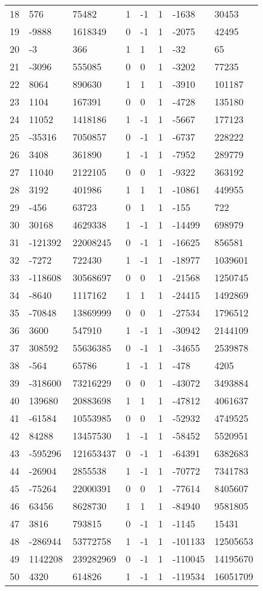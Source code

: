 \documentclass{amsart}
\begin{document}
\begin{longtable}{|l|l|l|lllll|}
18&576&75482&1&-1&1&-1638&30453\\
19&-9888&1618349&0&-1&1&-2075&42495\\
20&-3&366&1&1&1&-32&65\\
21&-3096&555085&0&0&1&-3202&77235\\
22&8064&890630&1&1&1&-3910&101187\\
23&1104&167391&0&0&1&-4728&135180\\
24&11052&1418186&1&-1&1&-5667&177123\\
25&-35316&7050857&0&-1&1&-6737&228222\\
26&3408&361890&1&-1&1&-7952&289779\\
27&11040&2122105&0&0&1&-9322&363192\\
28&3192&401986&1&1&1&-10861&449955\\
29&-456&63723&0&1&1&-155&722\\
30&30168&4629338&1&-1&1&-14499&698979\\
31&-121392&22008245&0&-1&1&-16625&856581\\
32&-7272&722430&1&-1&1&-18977&1039601\\
33&-118608&30568697&0&0&1&-21568&1250745\\
34&-8640&1117162&1&1&1&-24415&1492869\\
35&-70848&13869999&0&0&1&-27534&1796512\\
36&3600&547910&1&-1&1&-30942&2144109\\
37&308592&55636385&0&-1&1&-34655&2539878\\
38&-564&65786&1&-1&1&-478&4205\\
39&-318600&73216229&0&0&1&-43072&3493884\\
40&139680&20883698&1&1&1&-47812&4061637\\
41&-61584&10553985&0&0&1&-52932&4749525\\
42&84288&13457530&1&-1&1&-58452&5520951\\
43&-595296&121653437&0&-1&1&-64391&6382683\\
44&-26904&2855538&1&-1&1&-70772&7341783\\
45&-75264&22000391&0&0&1&-77614&8405607\\
46&63456&8628730&1&1&1&-84940&9581805\\
47&3816&793815&0&-1&1&-1145&15431\\
48&-286944&53772758&1&-1&1&-101133&12505653\\
49&1142208&239282969&0&-1&1&-110045&14195670\\
50&4320&614826&1&-1&1&-119534&16051709\\
\hline
\end{longtable}
\end{document}
